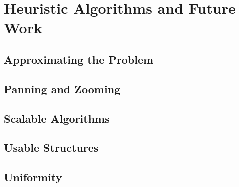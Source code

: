 \chapter{Heuristic Algorithms and Future Work}
\label{chap:future}
\section{Approximating the Problem}
\section{Panning and Zooming}
\section{Scalable Algorithms}
\section{Usable Structures}
\section{Uniformity}
